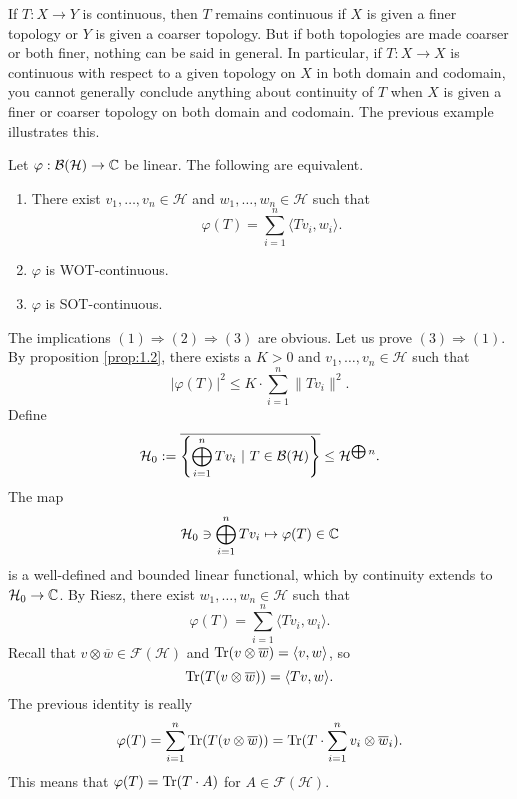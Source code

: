 \begin{remark}
  If $T:X\to Y$ is continuous, then $T$ remains continuous if $X$ is given a finer topology or $Y$ is given a coarser topology. 
  But if both topologies are made coarser or both finer, nothing can be said in general. In particular, if $T:X\to X$ is 
  continuous with respect to a given topology on $X$ in both domain and codomain, you cannot generally conclude anything 
  about continuity of $T$ when $X$ is given a finer or coarser topology on both domain and codomain. The previous example illustrates this.
\end{remark}

\begin{lemma}
  Let $\varphi: \operatorname{\mathcal{B} (\mathcal{H})} \to \mathbb {C}$ be linear. The following are equivalent.
  \begin{enumerate}
    \item There exist $v_1, \dots, v_n \in \mathcal{H}$ and $w_1, \dots, w_n \in \mathcal{H}$ such that 
    $$\varphi (T) = \sum_{i = 1} ^n \langle T v_i, w_i \rangle.$$
    \item $\varphi$ is WOT-continuous.
    \item $\varphi$ is SOT-continuous.
  \end{enumerate}
\end{lemma}

\begin{myproof}
  The implications $(1) \Rightarrow (2) \Rightarrow (3)$ are obvious. Let us prove $(3) \Rightarrow (1)$.
  By proposition \ref{prop:1.2}, there exists a $K > 0$ and $v_1, \dots, v_n \in \mathcal{H}$
  such that 
  $$|\varphi(T)|^2 \leq K \cdot \sum_{i = 1} ^n \| Tv_i\|^2.$$
  Define $$\mathcal{H}_0 := \overline{\left\lbrace \bigoplus_{i = 1} ^n Tv_i\ |\ T \in \operatorname{\mathcal{B} (\mathcal{H})} \right\rbrace} \leq \mathcal{H} ^{\bigoplus n}.$$
  The map 
  $$\mathcal{H}_0 \ni \bigoplus_{i = 1} ^n T v_i \mapsto \varphi(T) \in \mathbb {C}$$
  is a well-defined and bounded linear functional, which by continuity extends to $\mathcal{H}_0 \to \mathbb {C}$.
  By Riesz, there exist $w_1, \dots, w_n \in \mathcal{H}$ such that 
  $$\varphi(T) = \sum_{i = 1} ^n \langle T v_i, w_i \rangle.$$
  Recall that $v \otimes \overline{w} \in \mathcal{F} (\mathcal{H})$ and $\operatorname{Tr} (v \otimes \overline{w}) = \langle v, w \rangle$, so 
  $$\operatorname{Tr} (T (v \otimes \overline{w})) = \langle Tv, w \rangle.$$
  The previous identity is really 
  $$\varphi(T) = \sum_{i = 1} ^n \operatorname{Tr} (T (v \otimes \overline{w})) = \operatorname{Tr} (T \cdot \sum_{i = 1} ^n v_i \otimes \overline{w}_i).$$
  This means that $\varphi(T) = \operatorname{Tr} (T \cdot A)$ for $A \in \mathcal{F} (\mathcal{H})$.
\end{myproof}

